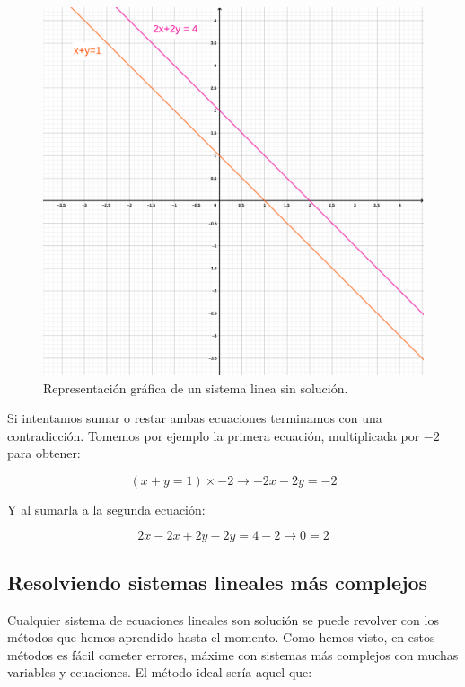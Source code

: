 \documentclass[
]{book}
\begin{document}
\begin{figure}

{\centering \includegraphics{Unidad-II/Sistema-no-solucion} 

}

\caption{Representación gráfica de un sistema linea sin solución.}\label{fig:sin-soln}
\end{figure}

Si intentamos sumar o restar ambas ecuaciones terminamos con una contradicción. Tomemos por ejemplo la primera ecuación, multiplicada por \(-2\) para obtener:

\[(x + y = 1) \times -2 \rightarrow -2x-2y = -2\]

Y al sumarla a la segunda ecuación:

\[2x - 2x + 2y - 2y = 4-2 \rightarrow 0 = 2\]

\hypertarget{resolviendo-sistemas-lineales-muxe1s-complejos}{%
\subsection{Resolviendo sistemas lineales más complejos}\label{resolviendo-sistemas-lineales-muxe1s-complejos}}

Cualquier sistema de ecuaciones lineales son solución se puede revolver con los métodos que hemos aprendido hasta el momento. Como hemos visto, en estos métodos es fácil cometer errores, máxime con sistemas más complejos con muchas variables y ecuaciones. El método ideal sería aquel que:
\end{document}

